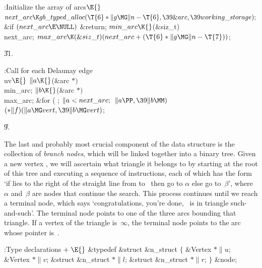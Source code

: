 \B{}:Initialize the array of arcs\X${}\E{}$\6
$\\{next\_arc}\K\\{gb\_typed\_alloc}(\T{6}*\|g\MG\|n-\T{6},\39\&{arc},\39%
\\{working\_storage});{}$\6
\&{if} ${}(\\{next\_arc}\E\NULL){}$\1\5
\&{return};\2\6
${}\\{min\_arc}\K{}$(\&{siz\_t}) \\{next\_arc};\6
${}\\{max\_arc}\K(\&{siz\_t})(\\{next\_arc}+(\T{6}*\|g\MG\|n-\T{7})){}$;\par
\U31.\fi

\B{}:Call  for each Delaunay edge \\{uv}\X${}\E{}$\6
$\|a\K{}$(\&{arc} ${}{*}){}$ \\{min\_arc};\6
${}\|b\K{}$(\&{arc} ${}{*}){}$ \\{max\_arc};\6
\&{for} ( ; ${}\|a<\\{next\_arc};{}$ ${}\|a\PP,\39\|b\MM){}$\1\5
${}({*}\|f)(\|a\MG\\{vert},\39\|b\MG\\{vert}){}$;\2\par
\U9.\fi

The last and probably most crucial component of the data structure
is the collection of {\sl branch nodes}, which will be linked together
into a binary tree.  Given a new vertex , we will ascertain what
triangle it belongs to by starting at the root of this tree and
executing a sequence of instructions, each of which has the form `if
 lies to the right of the straight line from  to~ then
go to
$\alpha$ else go to~$\beta$', where $\alpha$ and~$\beta$ are nodes
that continue the search. This process continues until we reach a
terminal node, which says `congratulations, you're done, ~is in
triangle such-and-such'. The terminal node points to one of the three
arcs bounding that triangle. If a vertex of the triangle is~$\infty$,
the terminal node points to the arc whose  pointer is~\PB{$%
\NULL$}.

\Y\B\4:Type declarations\X${}\mathrel+\E{}$\6
\&{typedef} \&{struct} \&{n\_struct} ${}\{{}$\1\6
\&{Vertex} ${}{*}\|u{}$;\6
\&{Vertex} ${}{*}\|v{}$;\6
\&{struct} \&{n\_struct} ${}{*}\|l{}$;\6
\&{struct} \&{n\_struct} ${}{*}\|r{}$;\2\6
${}\}{}$ \&{node};\par
\fi

